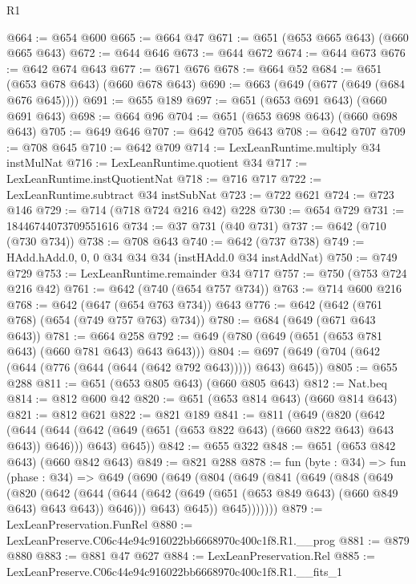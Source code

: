 \begin{lexlean}{R1}
\begin{coremodule}
@664 := @654 @600
@665 := @664 @47
@671 := @651 (@653 @665 @643) (@660 @665 @643)
@672 := @644 @646
@673 := @644 @672
@674 := @644 @673
@676 := @642 @674 @643
@677 := @671 @676
@678 := @664 @52
@684 := @651 (@653 @678 @643) (@660 @678 @643)
@690 := @663 (@649 (@677 (@649 (@684 @676 @645))))
@691 := @655 @189
@697 := @651 (@653 @691 @643) (@660 @691 @643)
@698 := @664 @96
@704 := @651 (@653 @698 @643) (@660 @698 @643)
@705 := @649 @646
@707 := @642 @705 @643
@708 := @642 @707
@709 := @708 @645
@710 := @642 @709
@714 := LexLeanRuntime.multiply @34 instMulNat
@716 := LexLeanRuntime.quotient @34
@717 := LexLeanRuntime.instQuotientNat
@718 := @716 @717
@722 := LexLeanRuntime.subtract @34 instSubNat
@723 := @722 @621
@724 := @723 @146
@729 := @714 (@718 @724 @216 @42) @228
@730 := @654 @729
@731 := 18446744073709551616
@734 := @37 @731 (@40 @731)
@737 := @642 (@710 (@730 @734))
@738 := @708 @643
@740 := @642 (@737 @738)
@749 := HAdd.hAdd.{0, 0, 0} @34 @34 @34 (instHAdd.{0} @34 instAddNat)
@750 := @749 @729
@753 := LexLeanRuntime.remainder @34 @717
@757 := @750 (@753 @724 @216 @42)
@761 := @642 (@740 (@654 @757 @734))
@763 := @714 @600 @216
@768 := @642 (@647 (@654 @763 @734)) @643
@776 := @642 (@642 (@761 @768) (@654 (@749 @757 @763) @734))
@780 := @684 (@649 (@671 @643 @643))
@781 := @664 @258
@792 := @649 (@780 (@649 (@651 (@653 @781 @643) (@660 @781 @643) @643 @643)))
@804 := @697 (@649 (@704 (@642 (@644 (@776 (@644 (@644 (@642 @792 @643))))) @643) @645))
@805 := @655 @288
@811 := @651 (@653 @805 @643) (@660 @805 @643)
@812 := Nat.beq
@814 := @812 @600 @42
@820 := @651 (@653 @814 @643) (@660 @814 @643)
@821 := @812 @621
@822 := @821 @189
@841 := @811
    (@649
      (@820
        (@642
          (@644 (@644 (@642 (@649 (@651 (@653 @822 @643) (@660 @822 @643) @643 @643)) @646)))
          @643)
        @645))
@842 := @655 @322
@848 := @651 (@653 @842 @643) (@660 @842 @643)
@849 := @821 @288
@878 := fun (byte : @34) =>
  fun (phase : @34) =>
  @649
    (@690
      (@649
        (@804
          (@649
            (@841
              (@649
                (@848
                  (@649
                    (@820
                      (@642
                        (@644
                          (@644
                            (@642 (@649 (@651 (@653 @849 @643) (@660 @849 @643) @643 @643)) @646)))
                        @643)
                      @645))
                  @645)))))))
@879 := LexLeanPreservation.FunRel
@880 := LexLeanPreserve.C06c44e94c916022bb6668970c400c1f8.R1.__prog
@881 := @879 @880
@883 := @881 @47 @627
@884 := LexLeanPreservation.Rel
@885 := LexLeanPreserve.C06c44e94c916022bb6668970c400c1f8.R1.__fits_1

\end{coremodule}
\end{lexlean}
